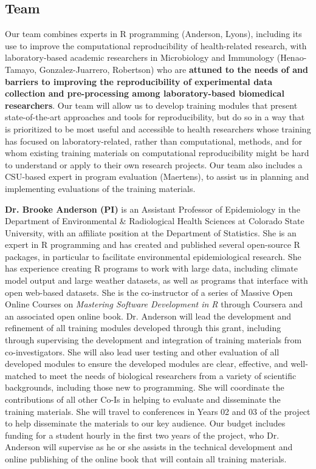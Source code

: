 \documentclass[pdftex,english,11pt,parskip=half]{scrartcl}
\begin{document}
\subsection{Team}

Our team combines experts in R programming (Anderson, Lyons), including its use to improve the computational reproducibility of health-related research, with laboratory-based academic researchers in Microbiology and Immunology (Henao-Tamayo, Gonzalez-Juarrero, Robertson) who are \textbf{attuned to the needs of and barriers to improving the reproducibility of experimental data collection and pre-processing among laboratory-based biomedical researchers}. Our team will allow us to develop training modules that present state-of-the-art approaches and tools for reproducibility, but do so in a way that is prioritized to be most useful and accessible to health researchers whose training has focused on laboratory-related, rather than computational, methods, and for whom existing training materials on computational reproducibility might be hard to understand or apply to their own research projects. Our team also includes a CSU-based expert in program evaluation (Maertens), to assist us in planning and implementing evaluations of the training materials.

\noindent \textbf{Dr. Brooke Anderson (PI)} is an Assistant Professor of Epidemiology in the Department of Environmental \& Radiological Health Sciences at Colorado State University, with an affiliate position at the Department of Statistics. She is an expert in R programming and has created and published several open-source R packages, in particular to facilitate environmental epidemiological research. She has experience creating R programs to work with large data, including climate model output and large weather datasets, as well as programs that interface with open web-based datasets. She is the co-instructor of a series of Massive Open Online Courses on \textit{Mastering Software Development in R} through Coursera and an associated open online book. Dr. Anderson will lead the development and refinement of all training modules developed through this grant, including through supervising the development and integration of training materials from co-investigators. She will also lead user testing and other evaluation of all developed modules to ensure the developed modules are clear, effective, and well-matched to meet the needs of biological researchers from a variety of scientific backgrounds, including those new to programming. She will coordinate the contributions of all other Co-Is in helping to evaluate and disseminate the training materials. She will travel to conferences in Years 02 and 03 of the project to help disseminate the materials to our key audience. Our budget includes funding for a student hourly in the first two years of the project, who Dr. Anderson will supervise as he or she assists in the technical development and online publishing of the online book that will contain all training materials.
\end{document}

